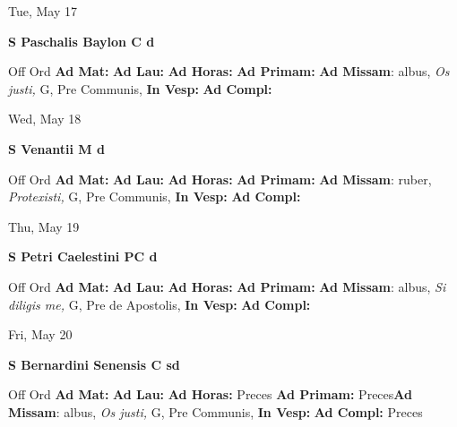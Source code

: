 \documentclass[10pt]{memoir}
\begin{document}
\begin{center}
\begin{minipage}{3.5in}
\vspace{2em}
\begin{center}Tue, May 17
\end{center}
\textbf{ \large S Paschalis Baylon C
\textnormal{\normalsize d}}

\begin{justify}Off Ord
\textbf{Ad Mat: }
\textbf{Ad Lau: }
\textbf{Ad Horas: }
\textbf{Ad Primam: }\textbf{Ad Missam}: albus, \textit{Os justi,} G, Pre Communis, 
\textbf{In Vesp: }
\textbf{Ad Compl: }
\end{justify}
\end{minipage}
\end{center}

\begin{center}
\begin{minipage}{3.5in}
\vspace{2em}
\begin{center}Wed, May 18
\end{center}
\textbf{ \large S Venantii M
\textnormal{\normalsize d}}

\begin{justify}Off Ord
\textbf{Ad Mat: }
\textbf{Ad Lau: }
\textbf{Ad Horas: }
\textbf{Ad Primam: }\textbf{Ad Missam}: ruber, \textit{Protexisti,} G, Pre Communis, 
\textbf{In Vesp: }
\textbf{Ad Compl: }
\end{justify}
\end{minipage}
\end{center}

\begin{center}
\begin{minipage}{3.5in}
\vspace{2em}
\begin{center}Thu, May 19
\end{center}
\textbf{ \large S Petri Caelestini PC
\textnormal{\normalsize d}}

\begin{justify}Off Ord
\textbf{Ad Mat: }
\textbf{Ad Lau: }
\textbf{Ad Horas: }
\textbf{Ad Primam: }\textbf{Ad Missam}: albus, \textit{Si diligis me,} G, Pre de Apostolis, 
\textbf{In Vesp: }
\textbf{Ad Compl: }
\end{justify}
\end{minipage}
\end{center}

\begin{center}
\begin{minipage}{3.5in}
\vspace{2em}
\begin{center}Fri, May 20
\end{center}
\textbf{ \large S Bernardini Senensis C
\textnormal{\normalsize sd}}

\begin{justify}Off Ord
\textbf{Ad Mat: }
\textbf{Ad Lau: }
\textbf{Ad Horas: }Preces
\textbf{Ad Primam: }Preces\textbf{Ad Missam}: albus, \textit{Os justi,} G, Pre Communis, 
\textbf{In Vesp: }
\textbf{Ad Compl: }Preces
\end{justify}
\end{minipage}
\end{center}
\end{document}
